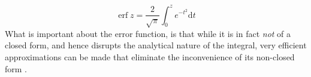 \begin{equation}
\operatorname{erf} z=\frac{2}{\sqrt{\pi}} \int_{0}^{z} e^{-t^{2}} \mathrm{d} t
\end{equation}
What is important about the error function, is that while it is in fact \textit{not} of a closed form, and hence disrupts the analytical nature of the integral, very efficient approximations can be made that eliminate the inconvenience of its non-closed form \cite{Ren2007Closed-formScience}.